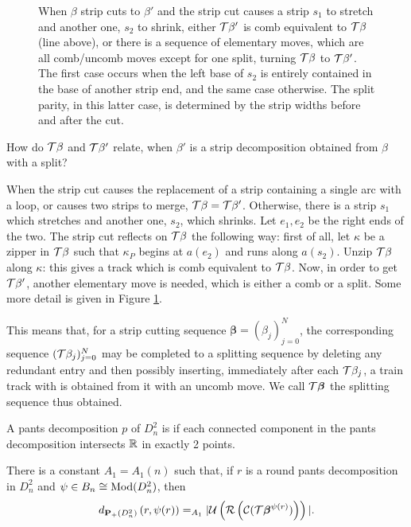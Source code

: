 \begin{figure}
\centering
\def\svgwidth{.8\textwidth}

\caption{\label{fig:cutissplit}When $\beta$ strip cuts to $\beta'$ and the strip cut causes a strip $s_1$ to stretch and another one, $s_2$ to shrink, either ${\mathcal T}\beta'$ is comb equivalent to ${\mathcal T}\beta$ (line above), or there is a sequence of elementary moves, which are all comb/uncomb moves except for one split, turning ${\mathcal T}\beta$ to ${\mathcal T}\beta'$. The first case occurs when the left base of $s_2$ is entirely contained in the base of another strip end, and the same case otherwise. The split parity, in this latter case, is determined by the strip widths before and after the cut.}
\end{figure}

How do ${\mathcal T}\beta$ and ${\mathcal T}\beta'$ relate, when $\beta'$ is a strip decomposition obtained from $\beta$ with a split?

When the strip cut causes the replacement of a strip containing a single arc with a loop, or causes two strips to merge, ${\mathcal T}\beta={\mathcal T}\beta'$. Otherwise, there is a strip $s_1$ which stretches and another one, $s_2$, which shrinks. Let $e_1,e_2$ be the right ends of the two. The strip cut reflects on ${\mathcal T}\beta$ the following way: first of all, let $\kappa$ be a zipper in ${\mathcal T}\beta$ such that $\kappa_P$ begins at $a(e_2)$ and runs along $a(s_2)$. Unzip ${\mathcal T}\beta$ along $\kappa$: this gives a track which is comb equivalent to ${\mathcal T}\beta$. Now, in order to get ${\mathcal T}\beta'$, another elementary move is needed, which is either a comb or a split. Some more detail is given in Figure \ref{fig:cutissplit}.

This means that, for a strip cutting sequence $\bm\beta=(\beta_j)_{j=0}^N$, the corresponding sequence $({\mathcal T}\beta_j)_{j=0}^N$ may be completed to a splitting sequence by deleting any redundant entry and then possibly inserting, immediately after each ${\mathcal T}\beta_j$, a train track with is obtained from it with an uncomb move. We call ${\mathcal T}\bm\beta$ the splitting sequence thus obtained.

\begin{defin}
A pants decomposition $p$ of $D^2_n$ is  if each connected component in the pants decomposition intersects $\mathbb R$ in exactly 2 points.
\end{defin}

\begin{coroll}\label{cor:dwgivesdistance}
There is a constant $A_1=A_1(n)$ such that, if $r$ is a round pants decomposition in $D^2_n$ and $\psi\in B_n\cong \mathrm{Mod}(D^2_n)$, then
$$d_{{\mathbf{P}_+}(D^2_n)}\left(r,\psi(r)\right)=_{A_1}|{\mathcal U}\left({\mathcal R}\left({\mathcal C}({\mathcal T}\bm\beta^{\psi(r)})\right)\right)|.$$
\end{coroll}

